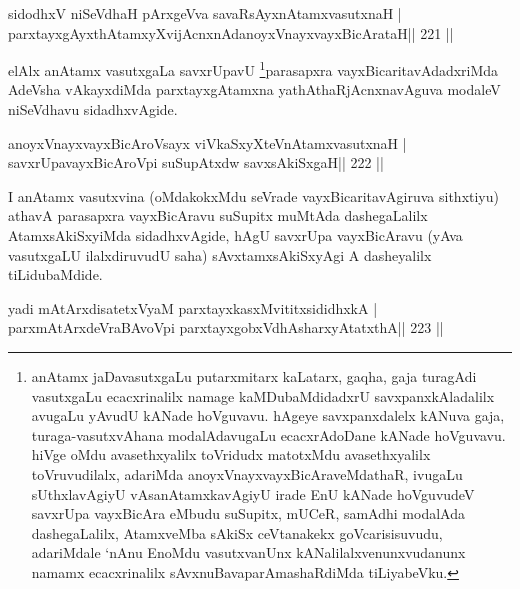 \begin{shl}
sidodhxV niSeVdhaH pArxgeVva savaRsAyxnAtamxvasutxnaH |
parxtayxgAyxthAtamxyXvijAcnxnAdanoyxVnayxvayxBicArataH\hfill || 221 ||
\end{shl}

\begin{artha}
elAlx anAtamx vasutxgaLa savxrUpavU \footnote[1]{anAtamx
  jaDavasutxgaLu putarxmitarx kaLatarx, gaqha, gaja turagAdi vasutxgaLu
  ecacxrinalilx namage kaMDubaMdidadxrU savxpanxkAladalilx avugaLu
  yAvudU kANade hoVguvavu. hAgeye savxpanxdalelx kANuva gaja,
  turaga-vasutxvAhana modalAdavugaLu ecacxrAdoDane kANade hoVguvavu.
  hiVge oMdu avasethxyalilx toVridudx matotxMdu avasethxyalilx
  toVruvudilalx, adariMda anoyxVnayxvayxBicAraveMdathaR,
  ivugaLu sUthxlavAgiyU vAsanAtamxkavAgiyU irade EnU kANade hoVguvudeV
  savxrUpa vayxBicAra eMbudu suSupitx, mUCeR, samAdhi modalAda
  dashegaLalilx, AtamxveMba sAkiSx ceVtanakekx goVcarisisuvudu,
  adariMdale `nAnu EnoMdu vasutxvanUnx kANalilalxvenunxvudanunx namamx
  ecacxrinalilx sAvxnuBavaparAmashaRdiMda tiLiyabeVku.}parasapxra
vayxBicaritavAdadxriMda AdeVsha vAkayxdiMda parxtayxgAtamxna
yathAthaRjAcnxnavAguva modaleV niSeVdhavu sidadhxvAgide.
\end{artha}


\begin{shl}
\footnotemark[1]anoyxVnayxvayxBicAroV\s sayx viVkaSxyXteV\s nAtamxvasutxnaH |
\footnotemark[2]savxrUpavayxBicAroV\s pi suSupAtxdw savxsAkiSxgaH\hfill || 222 ||
\end{shl}

\begin{artha}
I anAtamx vasutxvina (oMdakokxMdu seVrade vayxBicaritavAgiruva sithxtiyu) athavA parasapxra vayxBicAravu suSupitx muMtAda dashegaLalilx AtamxsAkiSxyiMda sidadhxvAgide, hAgU savxrUpa vayxBicAravu (yAva vasutxgaLU ilalxdiruvudU saha) sAvxtamxsAkiSxyAgi A dasheyalilx tiLidubaMdide.
\end{artha}

\begin{shl}
yadi mAtArxdisatetxVyaM parxtayxkasxMvititxsididhxkA |
parxmAtArxdeVraBAvoV\s pi parxtayxgobxVdhAsharxyAtatxthA\hfill || 223 ||
\end{shl}

